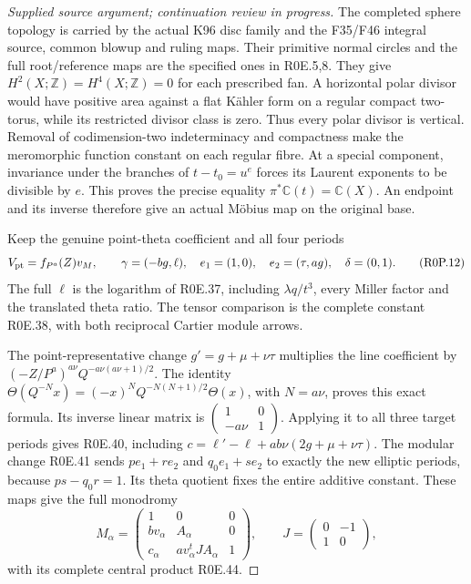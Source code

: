 \begin{proof}[Supplied source argument; continuation review in progress]
The completed sphere topology is carried by the actual K96 disc
family and the F35/F46 integral source, common blowup and ruling
maps. Their primitive normal circles and the full root/reference
maps are the specified ones in R0E.5,8. They give
\(H^2(X;\mathbb Z)=H^4(X;\mathbb Z)=0\) for each prescribed
fan. A horizontal polar divisor would have positive area against
a flat Kähler form on a regular compact two-torus, while its
restricted divisor class is zero. Thus every polar divisor is
vertical. Removal of codimension-two indeterminacy and compactness
make the meromorphic function constant on each regular fibre.
At a special component, invariance under the branches of
\(t-t_0=u^e\) forces its Laurent exponents to be divisible by
\(e\). This proves the precise equality
\(\pi^*\mathbb C(t)=\mathbb C(X)\). An endpoint and its inverse
therefore give an actual Möbius map on the original base.

Keep the genuine point-theta coefficient and all four periods
\[
 V_{\rm pt}=f_{P^a}(Z)v_M,\qquad
 \gamma=(-bg,\ell),\quad e_1=(1,0),\quad
 e_2=(\tau,ag),\quad\delta=(0,1).
 \tag{R0P.12}
\]
The full \(\ell\) is the logarithm of R0E.37, including
\(\lambda q/t^3\), every Miller factor and the translated theta
ratio. The tensor comparison is the complete constant R0E.38,
with both reciprocal Cartier module arrows.

The point-representative change \(g'=g+\mu+\nu\tau\) multiplies
the line coefficient by
\((-Z/P^a)^{a\nu}Q^{-a\nu(a\nu+1)/2}\). The identity
\(\Theta(Q^{-N}x)=(-x)^NQ^{-N(N+1)/2}\Theta(x)\), with
\(N=a\nu\), proves this exact formula. Its inverse linear
matrix is \(\left(\begin{smallmatrix}1&0\\-a\nu&1\end{smallmatrix}\right)\).
Applying it to all three target periods gives R0E.40, including
\(c=\ell'-\ell+ab\nu(2g+\mu+\nu\tau)\). The modular
change R0E.41 sends \(p e_1+r e_2\) and \(q_0e_1+s e_2\)
to exactly the new elliptic periods, because \(ps-q_0r=1\).
Its theta quotient fixes the entire additive constant. These
maps give the full monodromy
\[
 M_\alpha=
 \begin{pmatrix}1&0&0\\ bv_\alpha&A_\alpha&0\\
 c_\alpha&av_\alpha^tJA_\alpha&1\end{pmatrix},
 \qquad J=\begin{pmatrix}0&-1\\1&0\end{pmatrix},
 \tag{R0P.13}
\]
with its complete central product R0E.44.


\end{proof}
